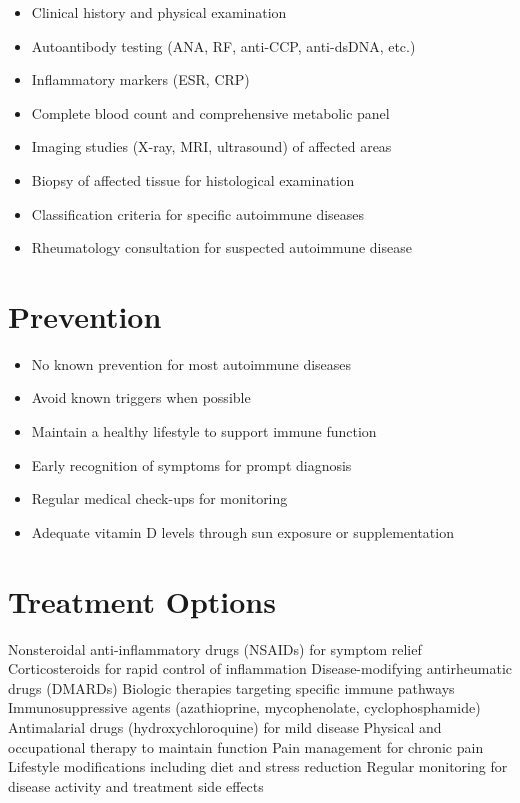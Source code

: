 \begin{itemize}[noitemsep]
  \item Clinical history and physical examination
  \item Autoantibody testing (ANA, RF, anti-CCP, anti-dsDNA, etc.)
  \item Inflammatory markers (ESR, CRP)
  \item Complete blood count and comprehensive metabolic panel
  \item Imaging studies (X-ray, MRI, ultrasound) of affected areas
  \item Biopsy of affected tissue for histological examination
  \item Classification criteria for specific autoimmune diseases
  \item Rheumatology consultation for suspected autoimmune disease
\end{itemize}
\section{Prevention}
\begin{itemize}[noitemsep]
  \item No known prevention for most autoimmune diseases
  \item Avoid known triggers when possible
  \item Maintain a healthy lifestyle to support immune function
  \item Early recognition of symptoms for prompt diagnosis
  \item Regular medical check-ups for monitoring
  \item Adequate vitamin D levels through sun exposure or supplementation
\end{itemize}
\section{Treatment Options}
Nonsteroidal anti-inflammatory drugs (NSAIDs) for symptom relief Corticosteroids for rapid control of inflammation Disease-modifying antirheumatic drugs (DMARDs) Biologic therapies targeting specific immune pathways Immunosuppressive agents (azathioprine, mycophenolate, cyclophosphamide) Antimalarial drugs (hydroxychloroquine) for mild disease Physical and occupational therapy to maintain function Pain management for chronic pain Lifestyle modifications including diet and stress reduction Regular monitoring for disease activity and treatment side effects

